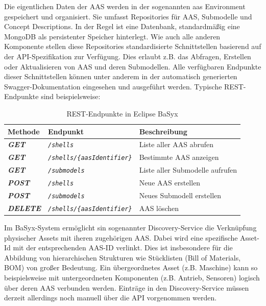 Die eigentlichen Daten der AAS werden in der sogenannten \acs{aas} Environment gespeichert und organisiert.
Sie umfasst Repositories für AAS, Submodelle und Concept Descriptions.
In der Regel ist eine Datenbank, standardmäßig eine MongoDB als persistenter Speicher hinterlegt.
Wie auch alle anderen Komponente stellen diese Repositories standardisierte Schnittstellen basierend auf der API-Spezifikation zur Verfügung.
Dies erlaubt z.B. das Abfragen, Erstellen oder Aktualisieren von AAS und deren Submodellen.
Alle verfügbaren Endpunkte dieser Schnittstellen können unter anderem in der automatisch generierten Swagger-Dokumentation eingesehen und ausgeführt werden. 
Typische REST-Endpunkte sind beispielsweise:

\vspace{1em}
\begin{table}[htbp]
    \centering
    \begin{tabular}{l l l}
        \toprule
        \textbf{Methode} & \textbf{Endpunkt} & \textbf{Beschreibung} \\
        \toprule
        \textbf{\textcolor{green!50!black}{\textit{GET}}}     & \texttt{\textit{/shells}} & Liste aller AAS abrufen \\
        \textbf{\textcolor{green!50!black}{\textit{GET}}}     & \texttt{\textit{/shells/\{aasIdentifier\}}} & Bestimmte AAS anzeigen \\
        \textbf{\textcolor{green!50!black}{\textit{GET}}}     & \texttt{\textit{/submodels}} & Liste aller Submodelle aufrufen \\
        \textbf{\textcolor{orange!85!black}{\textit{POST}}}    & \texttt{\textit{/shells}} & Neue AAS erstellen \\
        \textbf{\textcolor{orange!85!black}{\textit{POST}}}    & \texttt{\textit{/submodels}} & Neues Submodell erstellen \\
        \textbf{\textcolor{red!80!black}{\textit{DELETE}}}  & \texttt{\textit{/shells/\{aasIdentifier\}}} & AAS löschen \\
        \midrule
    \end{tabular}
    \caption{REST-Endpunkte in Eclipse BaSyx}
    \label{tab:aas_endpoints}
\end{table}

Im BaSyx-System ermöglicht sin sogenannter Discovery-Service die Verknüpfung physischer Assets mit iheren zugehörigen AAS.
Dabei wird eine spezifische Asset-Id mit der entsprechenden AAS-ID verlinkt.
Dies ist insbesondere für die Abbildung von hierarchischen Strukturen wie Stücklisten (Bill of Materials, BOM) von großer Bedeutung.
Ein übergeordnetes Asset (z.B. Maschine) kann so beispielsweise mit untergeordneten Komponenten (z.B. Antrieb, Sensoren) logisch über deren AAS verbunden werden.
Einträge in den Discovery-Service müssen derzeit allerdings noch manuell über die API vorgenommen werden.

